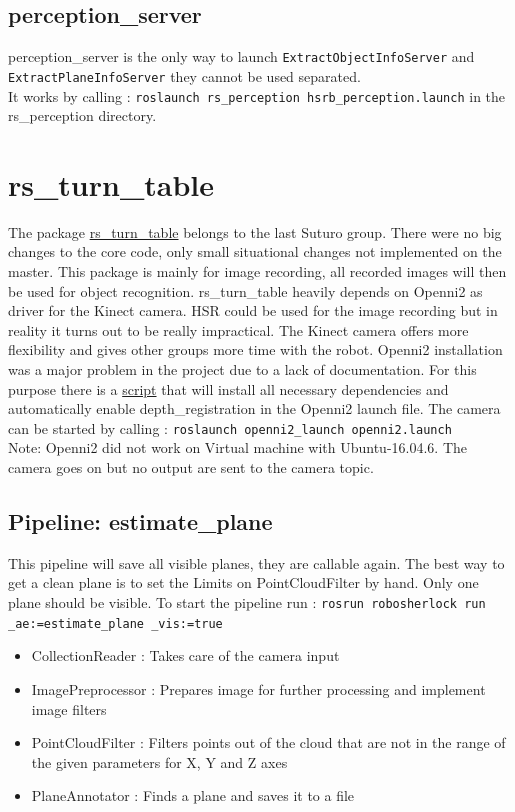\documentclass[main.tex]{subfiles}
\begin{document}
			\subsection{perception\_server}
perception\_server is the only way to launch \texttt{ExtractObjectInfoServer} and \texttt{ExtractPlaneInfoServer} they cannot be used separated. \\
It works by calling : \texttt{roslaunch rs\_perception hsrb\_perception.launch} in the rs\_perception directory.

		\section{rs\_turn\_table}
The package \href{https://github.com/Vanessa-rin/rs_turn_table}{rs\_turn\_table} belongs to the last Suturo group. There were no big changes to the core code, only small situational changes not implemented on the master. 
This package is mainly for image recording, all recorded images will then be used for object recognition.  
rs\_turn\_table heavily depends on Openni2 as driver for the Kinect camera. HSR could be used for the image recording but in reality it turns out to be really impractical. 
The Kinect camera offers more flexibility and gives other groups more time with the robot. Openni2 installation was a major problem in the project due to a lack of documentation. For this purpose there is a 
\href{https://github.com/SUTURO/suturo_perception/blob/Openni2/Openni2/Openni2_Install}{script} that will install all necessary dependencies and automatically enable depth\_registration in the Openni2 launch file. The camera can be started by calling : \texttt{roslaunch openni2\_launch openni2.launch}
 \\ Note: Openni2 did not work on Virtual machine with Ubuntu-16.04.6. The camera goes on but no output are sent to the camera topic. 

			\subsection{Pipeline: estimate\_plane}
This pipeline will save all visible planes, they are callable again. The best way to get a clean plane is to set the Limits on PointCloudFilter by hand. Only one plane should be visible. To start the pipeline run : \texttt{rosrun robosherlock run \_ae:=estimate\_plane \_vis:=true} 
\begin{itemize}
	\item CollectionReader : Takes care of the camera input
	\item ImagePreprocessor : Prepares image for further processing and implement image filters  
	\item PointCloudFilter : Filters points out of the cloud that are not in the range of the given parameters for X, Y and Z axes
	\item PlaneAnnotator : Finds a plane and saves it to a file 
\end{itemize}
\end{document}

